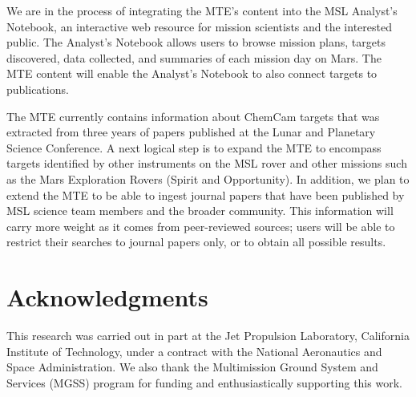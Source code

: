 \documentclass[letterpaper]{article} %
\begin{document}
We are in the process of integrating the MTE's content into the MSL
Analyst's Notebook, an interactive web resource for mission scientists
and the interested public.  The Analyst's Notebook allows users to
browse mission plans, targets discovered, data collected, and
summaries of each mission day on Mars.  The MTE content will enable
the Analyst's Notebook to also connect targets to publications.

The MTE currently contains information about ChemCam targets that was
extracted from three years of papers published at the Lunar and
Planetary Science Conference.  A next logical step is to expand the
MTE to encompass targets identified by other instruments on the MSL
rover and other missions such as the Mars Exploration Rovers (Spirit
and Opportunity).  In addition, we plan to extend the MTE to be able
to ingest journal papers that have been published by MSL science team
members and the broader community.  This information will carry more
weight as it comes from peer-reviewed sources; users will be able to
restrict their searches to journal papers only, or to obtain all
possible results.

\section{Acknowledgments}
This research was carried out in part at the Jet Propulsion Laboratory,
California Institute of Technology, under a contract with the National
Aeronautics and Space Administration.  
We also thank the Multimission Ground System and Services (MGSS)
program for funding and enthusiastically supporting this work.



\end{document}
